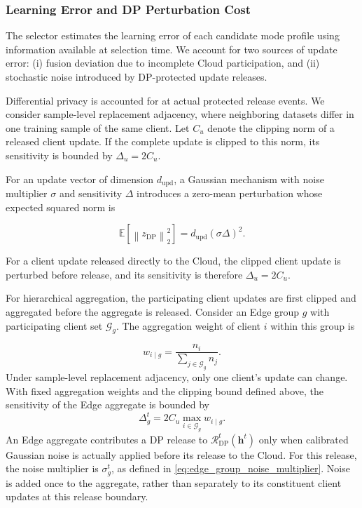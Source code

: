 \documentclass[5p,times]{elsarticle}
\theoremstyle{plain}
\theoremstyle{definition}
\theoremstyle{remark}
\begin{document}
\subsubsection{Learning Error and DP Perturbation Cost}
\label{sec:learning_cost}

The selector estimates the learning error of
each candidate mode profile using information
available at selection time.
We account for two sources of update error:
(i) fusion deviation due to incomplete
Cloud participation, and
(ii) stochastic noise introduced by
DP-protected update releases.

Differential privacy is accounted for at
actual protected release events.
We consider sample-level replacement adjacency,
where neighboring datasets differ in one
training sample of the same client.
Let \(C_u\) denote the clipping norm of a
released client update.
If the complete update is clipped to this norm,
its sensitivity is bounded by
\(\Delta_u=2C_u\).

For an update vector of dimension \(d_{\mathrm{upd}}\), a Gaussian mechanism
with noise multiplier \(\sigma\) and sensitivity \(\Delta\) introduces a
zero-mean perturbation whose expected squared norm is

\begin{equation}
\mathbb{E}
\left[
\left\|
z_{\mathrm{DP}}
\right\|_2^2
\right]
=
d_{\mathrm{upd}}
\left(
\sigma \Delta
\right)^2 .
\label{eq:gaussian_update_perturbation}
\end{equation}

For a client update released directly to the Cloud, the clipped client update
is perturbed before release, and its sensitivity is therefore
\(\Delta_u=2C_u\).

For hierarchical aggregation, the participating client updates are first
clipped and aggregated before the aggregate is released. Consider an Edge
group \(g\) with participating client set \(\mathcal G_g\). The aggregation
weight of client \(i\) within this group is

\begin{equation}
w_{i\mid g}
=
\frac{n_i}
{\sum_{j\in\mathcal G_g} n_j}.
\label{eq:edge_group_weight}
\end{equation}
Under sample-level replacement adjacency,
only one client's update can change.
With fixed aggregation weights and the
clipping bound defined above, the
sensitivity of the Edge aggregate is
bounded by
\begin{equation}
\Delta_g^t
=
2C_u
\max_{i\in\mathcal G_g}
w_{i\mid g}.
\label{eq:edge_group_sensitivity}
\end{equation}
An Edge aggregate contributes a DP release
to \(\mathcal R_{\mathrm{DP}}^t(\mathbf h^t)\)
only when calibrated Gaussian noise is
actually applied before its release to
the Cloud.
For this release, the noise multiplier is
\(\sigma_g^t\), as defined in
\eqref{eq:edge_group_noise_multiplier}.
Noise is added once to the aggregate,
rather than separately to its constituent
client updates at this release boundary.
\end{document}
